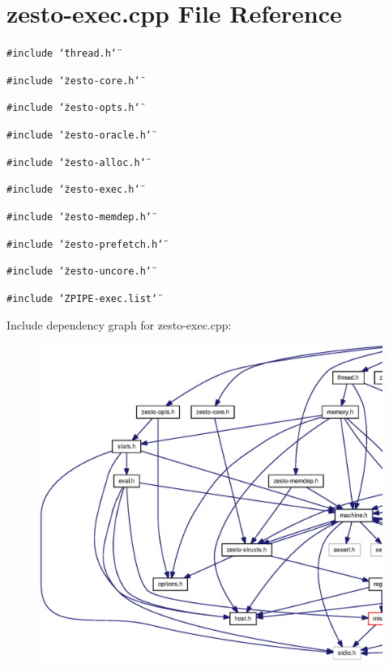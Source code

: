 \section{zesto-exec.cpp File Reference}
\label{zesto-exec_8cpp}
{\tt \#include \char`\"{}thread.h\char`\"{}}\par
{\tt \#include \char`\"{}zesto-core.h\char`\"{}}\par
{\tt \#include \char`\"{}zesto-opts.h\char`\"{}}\par
{\tt \#include \char`\"{}zesto-oracle.h\char`\"{}}\par
{\tt \#include \char`\"{}zesto-alloc.h\char`\"{}}\par
{\tt \#include \char`\"{}zesto-exec.h\char`\"{}}\par
{\tt \#include \char`\"{}zesto-memdep.h\char`\"{}}\par
{\tt \#include \char`\"{}zesto-prefetch.h\char`\"{}}\par
{\tt \#include \char`\"{}zesto-uncore.h\char`\"{}}\par
{\tt \#include \char`\"{}ZPIPE-exec.list\char`\"{}}\par


Include dependency graph for zesto-exec.cpp:\nopagebreak
\begin{figure}[H]
\begin{center}
\leavevmode
\includegraphics[width=420pt]{zesto-exec_8cpp__incl}
\end{center}
\end{figure}
